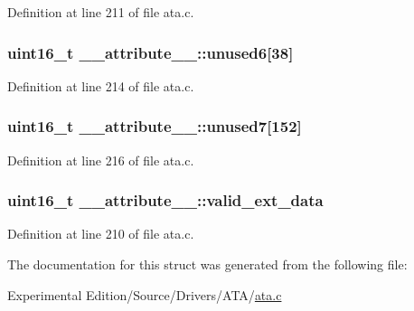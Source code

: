 Definition at line 211 of file ata.\+c.

\subsubsection[{\texorpdfstring{unused6}{unused6}}]{\setlength{\rightskip}{0pt plus 5cm}uint16\+\_\+t \+\_\+\+\_\+attribute\+\_\+\+\_\+\+::unused6\mbox{[}38\mbox{]}}\hypertarget{struct____attribute_____a2237e6caea302218050257b393aca1c8}{}\label{struct____attribute_____a2237e6caea302218050257b393aca1c8}


Definition at line 214 of file ata.\+c.

\subsubsection[{\texorpdfstring{unused7}{unused7}}]{\setlength{\rightskip}{0pt plus 5cm}uint16\+\_\+t \+\_\+\+\_\+attribute\+\_\+\+\_\+\+::unused7\mbox{[}152\mbox{]}}\hypertarget{struct____attribute_____a3ca12260c33c9b1431db806c9dcfe209}{}\label{struct____attribute_____a3ca12260c33c9b1431db806c9dcfe209}


Definition at line 216 of file ata.\+c.

\subsubsection[{\texorpdfstring{valid\+\_\+ext\+\_\+data}{valid_ext_data}}]{\setlength{\rightskip}{0pt plus 5cm}uint16\+\_\+t \+\_\+\+\_\+attribute\+\_\+\+\_\+\+::valid\+\_\+ext\+\_\+data}\hypertarget{struct____attribute_____a97f810c4d498d2027968fc454a7f7edd}{}\label{struct____attribute_____a97f810c4d498d2027968fc454a7f7edd}


Definition at line 210 of file ata.\+c.



The documentation for this struct was generated from the following file\+:\begin{DoxyCompactItemize}
\item 
Experimental Edition/\+Source/\+Drivers/\+A\+T\+A/\hyperlink{ata_8c}{ata.\+c}\end{DoxyCompactItemize}
